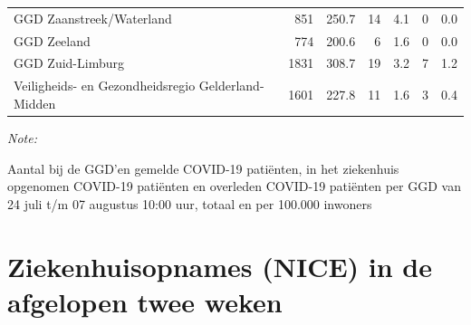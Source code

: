 \documentclass[
  english,
  man,floatsintext]{apa6}
\begin{document}
\begin{table}
\begin{threeparttable}
\begin{tabular}{lrrrrrr}
GGD Zaanstreek/Waterland & 851 & 250.7 & 14 & 4.1 & 0 & 0.0\\
GGD Zeeland & 774 & 200.6 & 6 & 1.6 & 0 & 0.0\\
GGD Zuid-Limburg & 1831 & 308.7 & 19 & 3.2 & 7 & 1.2\\
Veiligheids- en Gezondheidsregio Gelderland-Midden & 1601 & 227.8 & 11 & 1.6 & 3 & 0.4\\
\bottomrule
\end{tabular}
\begin{tablenotes}
\item \textit{Note: } 
\item Aantal bij de GGD’en gemelde COVID-19 patiënten, in het ziekenhuis opgenomen COVID-19 patiënten en overleden COVID-19 patiënten per GGD van 24 juli t/m 07 augustus 10:00 uur, totaal en per 100.000 inwoners
\end{tablenotes}
\end{threeparttable}
\endgroup{}
\end{table}

\newpage

\hypertarget{ziekenhuisopnames-nice-in-de-afgelopen-twee-weken}{%
\section{Ziekenhuisopnames (NICE) in de afgelopen twee weken}\label{ziekenhuisopnames-nice-in-de-afgelopen-twee-weken}}
\end{document}
